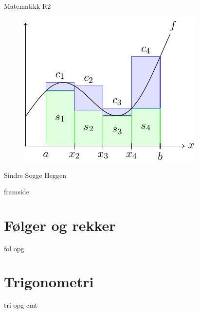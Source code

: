 



\setcounter{tocdepth}{1}	


	
	\pagecolor{blue!20}
	
	\begin{titlepage}
		\begin{center}
			\vspace*{1cm}
			
			{}
			
			\vspace{2.45cm} 
			\Large  Matematikk R2
			\begin{figure}[H]
				\centering
				\qquad\includegraphics[scale=1.8]{asymptote/frpg}
			\end{figure}           
			\vspace{2 cm}
			\raggedleft Sindre Sogge Heggen   \end{center}
	\end{titlepage}
	\pagecolor{white}
\newpage
\phantom{}
\thispagestyle{empty}	
\newpage	
{framside}
\newpage

\footnotesize
\tableofcontents
\normalsize
\chapter{Følger og rekker\label{Folgerogrekker}}
\vspace{20pt}
{fol}
\newpage
{opg}
\chapter{Trigonometri\label{Trigonometri}}
\vspace{20pt}
{tri}
\newpage
{opg}
\newpage
{cmt}
